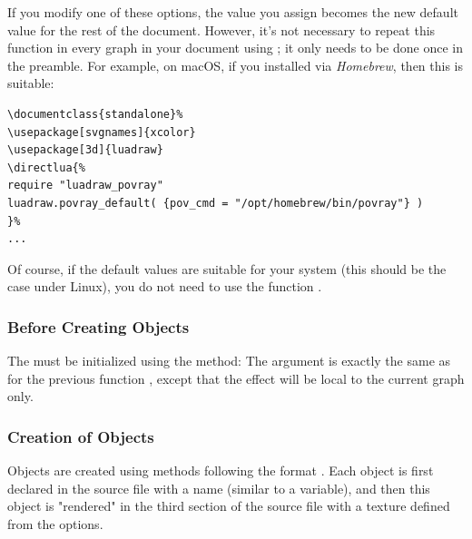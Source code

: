 If you modify one of these options, the value you assign becomes the new default value for the rest of the document. However, it's not necessary to repeat this function in every graph in your document using \povray; it only needs to be done once in the preamble. For example, on macOS, if you installed \povray via \emph{Homebrew}, then this is suitable:


\begin{verbatim}
\documentclass{standalone}%
\usepackage[svgnames]{xcolor}
\usepackage[3d]{luadraw}
\directlua{%
require "luadraw_povray"
luadraw.povray_default( {pov_cmd = "/opt/homebrew/bin/povray"} )
}%
...
\end{verbatim}

Of course, if the default values ​​are suitable for your system (this should be the case under Linux), you do not need to use the function .


\subsubsection{Before Creating Objects}

The \povray must be initialized using the method:
The argument  is exactly the same as for the previous function , except that the effect will be local to the current graph only.

\subsubsection{Creation of Objects}

Objects are created using methods following the format . Each object is first declared in the \povray source file with a name (similar to a variable), and then this object is "rendered" in the third section of the source file with a texture defined from the options.

